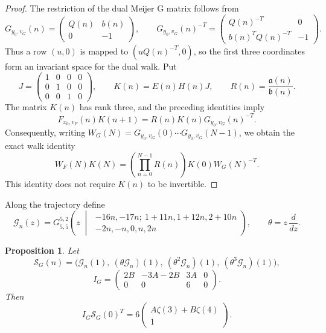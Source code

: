\documentclass[11pt]{article}
\newtheorem{proposition}{Proposition}
\begin{document}
\begin{proof}
The restriction of the dual Meijer G matrix follows from
\[
G_{y_0,v_G}(n)=\begin{pmatrix}Q(n)&b(n)\\0&-1\end{pmatrix},
\qquad
G_{y_0,v_G}(n)^{-T}
=\begin{pmatrix}Q(n)^{-T}&0\\b(n)^TQ(n)^{-T}&-1\end{pmatrix}.
\]
Thus a row $(u,0)$ is mapped to $(uQ(n)^{-T},0)$, so the first
three coordinates form an invariant space for the dual walk.
Put
\[
J=\begin{pmatrix}1&0&0&0\\0&1&0&0\\0&0&1&0\end{pmatrix},
\qquad K(n)=E(n)H(n)J,
\qquad R(n)=\frac{\mathfrak a(n)}{\mathfrak b(n)}.
\]
The matrix $K(n)$ has rank three, and the preceding identities imply
\[
F_{x_0,v_F}(n)K(n+1)=R(n)K(n)G_{y_0,v_G}(n)^{-T}.
\]
Consequently, writing $W_G(N)=G_{y_0,v_G}(0)\cdots
G_{y_0,v_G}(N-1)$, we obtain the exact walk identity
\[
W_F(N)K(N)
=\left(\prod_{n=0}^{N-1}R(n)\right)K(0)W_G(N)^{-T}.
\]
This identity does not require $K(n)$ to be invertible.
\end{proof}
Along the trajectory define
\[
\mathcal{G}_n(z)=G_{5,5}^{5,2}\!\left(
 z\;\middle|\;
 \begin{matrix}
 -16n,-17n;\ 1+11n,1+12n,2+10n\\
 -2n,-n,0,n,2n
 \end{matrix}\right),
\qquad \theta=z\,\frac{d}{dz}.
\]

\begin{proposition}
\label{prop:z34-initial-values}
Let
\[
\mathcal{S}_G(n)=\bigl(
\mathcal{G}_n(1),\ (\theta\mathcal{G}_n)(1),\
(\theta^2\mathcal{G}_n)(1),\ (\theta^3\mathcal{G}_n)(1)\bigr),
\]
\[
I_G=\begin{pmatrix}2B&-3A-2B&3A&0\\0&0&6&0\end{pmatrix}.
\]
Then
\[
I_G\mathcal{S}_G(0)^T
=6\begin{pmatrix}A\zeta(3)+B\zeta(4)\\1\end{pmatrix}.
\]
\end{proposition}
\end{document}
